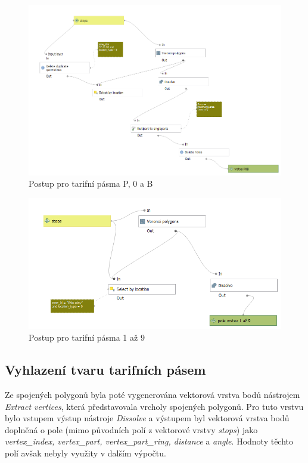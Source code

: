 \begin{figure}[H] \centering
    \includegraphics[width=400pt]{./pictures/postup-voronoi-P0B.png}
    \caption[Postup pro tarifní pásma P, 0 a B]{Postup pro tarifní pásma P, 0 a B}
	\label{fig:postup-voronoi-P0B}              
\end{figure}

\begin{figure}[H] \centering
    \includegraphics[width=400pt]{./pictures/postup-voronoi-1az9.png}
    \caption[Postup pro tarifní pásma 1 až 9]{Postup pro tarifní pásma 1 až 9}
	\label{fig:postup-voronoi-1az9}              
\end{figure}

\subsection{Vyhlazení tvaru tarifních pásem}

Ze spojených polygonů byla poté vygenerována vektorová vrstva bodů nástrojem
\textit{Extract vertices}, která představovala vrcholy spojených polygonů. Pro tuto vrstvu
bylo vstupem výstup nástroje \textit{Dissolve} a výstupem byl vektorová vrstva bodů 
doplněná o pole (mimo původních polí z vektorové vrstvy \textit{stops}) jako \textit{vertex\_index,
vertex\_part, vertex\_part\_ring, distance} a \textit{angle}.
Hodnoty těchto polí avšak nebyly využity v dalším výpočtu.


